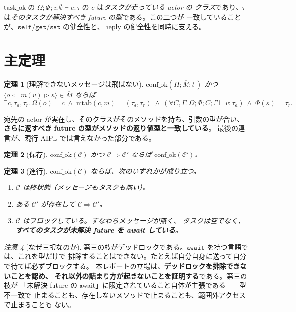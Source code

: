 \documentclass[11pt,a4paper]{ltjsarticle}
\newtheorem{theorem}{定理}
\theoremstyle{definition}
\theoremstyle{remark}
\newtheorem{remark}[theorem]{注意}
\newcommand{\Om}{\Omega}          %
\newcommand{\Ph}{\Phi}            %
\newcommand{\jt}[3]{\Om;\Ph;#1;#2 \vdash #3}
\newcommand{\mtab}{\mathrm{mtab}}
\newcommand{\cstep}{\Longrightarrow}
\newcommand{\taskok}{\mathrm{task\_ok}}
\newcommand{\confok}{\mathrm{conf\_ok}}
\begin{document}
$\taskok$ の $\jt{c}{\emptyset}{e:\tau}$ の $c$ は\emph{タスクが走っている actor の
クラス}であり、$\tau$ は\emph{そのタスクが解決すべき future の型}である。この二つが
一致していることが、$\mathtt{self}$/$\mathtt{get}$/$\mathtt{set}$ の健全性と、
reply の健全性を同時に支える。

\section{主定理}

\begin{theorem}[理解できないメッセージは飛ばない]
\label{thm:nmnu}
$\confok(H;\overline{M};\overline{t}\,)$ かつ
$\langle o \Leftarrow m(v) \rhd \kappa\rangle \in \overline{M}$ ならば
\[
\exists c, \tau_a, \tau_r.\
\Om(o) = c \;\land\; \mtab(c,m) = (\tau_a,\tau_r) \;\land\;
(\forall C,\Gamma.\ \jt{C}{\Gamma}{v : \tau_a}) \;\land\; \Ph(\kappa) = \tau_r.
\]
\end{theorem}

宛先の actor が実在し、そのクラスがそのメソッドを持ち、引数の型が合い、
\textbf{さらに返すべき future の型がメソッドの返り値型と一致している}。
最後の連言が、現行 AIPL では言えなかった部分である。

\begin{theorem}[保存]
\label{thm:pres}
$\confok(\mathcal{C})$ かつ $\mathcal{C} \cstep \mathcal{C}'$ ならば
$\confok(\mathcal{C}')$。
\end{theorem}

\begin{theorem}[進行]
\label{thm:prog}
$\confok(\mathcal{C})$ ならば、次のいずれかが成り立つ。
\begin{enumerate}
\item $\mathcal{C}$ は終状態（メッセージもタスクも無い）。
\item ある $\mathcal{C}'$ が存在して $\mathcal{C} \cstep \mathcal{C}'$。
\item $\mathcal{C}$ は\emph{ブロック}している。すなわちメッセージが無く、
      タスクは空でなく、\textbf{すべてのタスクが未解決 future を await している}。
\end{enumerate}
\end{theorem}

\begin{remark}[なぜ三択なのか]
第三の枝がデッドロックである。$\mathtt{await}$ を持つ言語では、これを型だけで
排除することはできない。たとえば自分自身に送って自分で待てば必ずブロックする。
本レポートの立場は、\textbf{デッドロックを排除できないことを認め、
それ以外の詰まり方が起きないことを証明する}である。第三の枝が
「未解決 future の await」に限定されていること自体が主張である ---- 型不一致で
止まることも、存在しないメソッドで止まることも、範囲外アクセスで止まることも
ない。
\end{remark}
\end{document}
